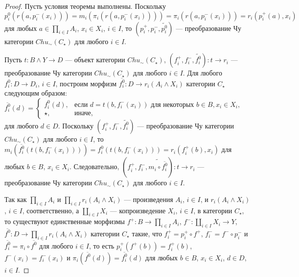 \documentclass[a4paper,12pt]{article}
\begin{document}
\begin{proof}
    Пусть условия теоремы выполнены. Поскольку $p^0_i(r(a,p^-_i(x_i))) = m_i(\pi_i(r(a,p^-_i(x_i)))) = \pi_i(r(a,p^-_i(x_i))) = r_i(p^+_i(a),x_i)$ для любых $a \in \prod_{i \in I} A_i$, $x_i \in X_i$, $i \in I$, то $(p^+_i,p^-_i,\widetilde{p^0_i})$ --- преобразование Чу категории $Chu_\sim(C_\star)$ для любого $i \in I$.

    Пусть $t: B \wedge Y \to D$ --- объект категории $Chu_\sim(C_\star)$, $(f^+_i,f^-_i,\widetilde{f^0_i}): t \to r_i$ --- преобразование Чу категории $Chu_\sim(C_\star)$ для любого $i \in I$. Для любого $f^0_i: D \to D_i$, $i \in I$, построим морфизм $\overline{f^0_i}: D \to r_i(A_i \wedge X_i)$ категории $C_\star$ следующим образом: $\overline{f^0_i}(d) = 
    \begin{cases}
        f^0_i(d),& \text{если } d = t(b,f^-_i(x_i)) \text{ для некоторых } b \in B, x_i \in X_i,\\
        \star,& \text{иначе},
    \end{cases}$
    для любого $d \in D$. Поскольку $(f^+_i,f^-_i,\widetilde{f^0_i})$ --- преобразование Чу категории $Chu_\sim(C_\star)$ для любого $i \in I$, то $m_i(\overline{f^0_i}(t(b,f^-_i(x_i)))) = f^0_i(t(b,f^-_i(x_i))) = r_i(f^+_i(b),x_i)$ для любых $b \in B$, $x_i \in X_i$. Следовательно, $(f^+_i,f^-_i,\widetilde{m_i \circ \overline{f^0_i}}): t \to r_i$ --- преобразование Чу категории $Chu_\sim(C_\star)$ для любого $i \in I$.

    Так как $\prod_{i \in I} A_i$ и $\prod_{i \in I} r_i(A_i \wedge X_i)$ --- произведения $A_i$, $ i \in I$, и $r_i(A_i \wedge X_i)$, $i \in I$, соответственно, а $\coprod_{i \in I} X_i$ --- копроизведение $X_i$, $i \in I$, в категории $C_\star$, то существуют единственные морфизмы $f^+: B \to \prod_{i \in I} A_i$, $f^-: \coprod_{i \in I} X_i \to Y$, $\overline{f^0}: D \to \prod_{i \in I} r_i(A_i \wedge X_i)$ категории $C_\star$ такие, что $f^+_i = p^+_i \circ f^+$, $f^-_i = f^- \circ p^-_i$ и $\overline{f^0_i} = \pi_i \circ \overline{f^0}$ для любого $i \in I$, то есть $p^+_i(f^+(b)) = f^+_i(b)$, $f^-(x_i) = f^-_i(x_i)$ и $\pi_i(\overline{f^0}(d)) = \overline{f^0_i}(d)$ для любых $b \in  B$, $x_i \in X_i$, $d \in D$, $i \in I$.


\end{proof}
\end{document}
